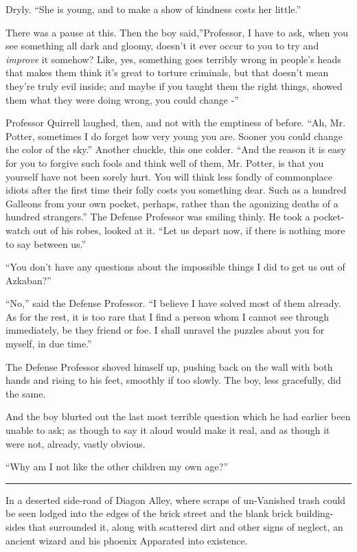 Dryly. ``She is young, and to make a show of kindness costs her
little.''

There was a pause at this. Then the boy said,''Professor, I have to ask,
when you see something all dark and gloomy, doesn't it ever occur to you
to try and \emph{improve} it somehow? Like, yes, something goes terribly
wrong in people's heads that makes them think it's great to torture
criminals, but that doesn't mean they're truly evil inside; and maybe if
you taught them the right things, showed them what they were doing
wrong, you could change -''

Professor Quirrell laughed, then, and not with the emptiness of before.
``Ah, Mr. Potter, sometimes I do forget how very young you are. Sooner
you could change the color of the sky.'' Another chuckle, this one
colder. ``And the reason it is easy for you to forgive such fools and
think well of them, Mr. Potter, is that you yourself have not been
sorely hurt. You will think less fondly of commonplace idiots after the
first time their folly costs you something dear. Such as a hundred
Galleons from your own pocket, perhaps, rather than the agonizing deaths
of a hundred strangers.'' The Defense Professor was smiling thinly. He
took a pocket-watch out of his robes, looked at it. ``Let us depart now,
if there is nothing more to say between us.''

``You don't have any questions about the impossible things I did to get
us out of Azkaban?''

``No,'' said the Defense Professor. ``I believe I have solved most of
them already. As for the rest, it is too rare that I find a person whom
I cannot see through immediately, be they friend or foe. I shall unravel
the puzzles about you for myself, in due time.''

The Defense Professor shoved himself up, pushing back on the wall with
both hands and rising to his feet, smoothly if too slowly. The boy, less
gracefully, did the same.

And the boy blurted out the last most terrible question which he had
earlier been unable to ask; as though to say it aloud would make it
real, and as though it were not, already, vastly obvious.

``Why am I not like the other children my own age?''

\begin{center}\rule{3in}{0.4pt}\end{center}

In a deserted side-road of Diagon Alley, where scraps of un-Vanished
trash could be seen lodged into the edges of the brick street and the
blank brick building-sides that surrounded it, along with scattered dirt
and other signs of neglect, an ancient wizard and his phoenix Apparated
into existence.

